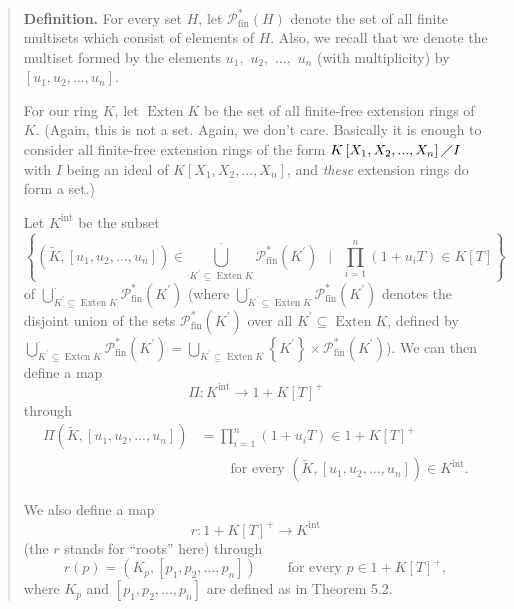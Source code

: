 \documentclass[numbers=enddot,12pt,final,onecolumn,notitlepage]{scrartcl}%
\begin{document}
\begin{quote}
\textbf{Definition.} For every set $H$, let $\mathcal{P}_{\operatorname*{fin}%
}^{\ast}\left(  H\right)  $ denote the set of all finite multisets which
consist of elements of $H$. Also, we recall that we denote the multiset formed
by the elements $u_{1},$ $u_{2},$ $...,$ $u_{n}$ (with multiplicity) by
$\left[  u_{1},u_{2},...,u_{n}\right]  $.

For our ring $K$, let $\operatorname*{Exten}K$ be the set of all finite-free
extension rings of $K$. (Again, this is not a set. Again, we don't care.
Basically it is enough to consider all finite-free extension rings of the form
$K\left[  X_{1},X_{2},...,X_{n}\right]  \diagup I$ with $I$ being an ideal of
$K\left[  X_{1},X_{2},...,X_{n}\right]  $, and \textit{these} extension rings
do form a set.)

Let $K^{\operatorname*{int}}$ be the subset%
\[
\left\{  \left(  \widetilde{K},\left[  u_{1},u_{2},...,u_{n}\right]  \right)
\in\bigcup\limits_{K^{\prime}\subseteq\operatorname*{Exten}K}^{\cdot
}\mathcal{P}_{\operatorname*{fin}}^{\ast}\left(  K^{\prime}\right)
\ \ \mid\ \ \prod\limits_{i=1}^{n}\left(  1+u_{i}T\right)  \in K\left[
T\right]  \right\}
\]
of $\bigcup\limits_{K^{\prime}\subseteq\operatorname*{Exten}K}^{\cdot
}\mathcal{P}_{\operatorname*{fin}}^{\ast}\left(  K^{\prime}\right)  $ (where
$\bigcup\limits_{K^{\prime}\subseteq\operatorname*{Exten}K}^{\cdot}%
\mathcal{P}_{\operatorname*{fin}}^{\ast}\left(  K^{\prime}\right)  $ denotes
the disjoint union of the sets $\mathcal{P}_{\operatorname*{fin}}^{\ast
}\left(  K^{\prime}\right)  $ over all $K^{\prime}\subseteq
\operatorname*{Exten}K$, defined by $\bigcup\limits_{K^{\prime}\subseteq
\operatorname*{Exten}K}^{\cdot}\mathcal{P}_{\operatorname*{fin}}^{\ast}\left(
K^{\prime}\right)  =\bigcup\limits_{K^{\prime}\subseteq\operatorname*{Exten}%
K}\left\{  K^{\prime}\right\}  \times\mathcal{P}_{\operatorname*{fin}}^{\ast
}\left(  K^{\prime}\right)  $). We can then define a map%
\[
\Pi:K^{\operatorname*{int}}\rightarrow1+K\left[  T\right]  ^{+}%
\]
through%
\begin{align*}
\Pi\left(  \widetilde{K},\left[  u_{1},u_{2},...,u_{n}\right]  \right)   &
=\prod\limits_{i=1}^{n}\left(  1+u_{i}T\right)  \in1+K\left[  T\right]  ^{+}\\
&  \ \ \ \ \ \ \ \ \ \ \text{for every }\left(  \widetilde{K},\left[
u_{1},u_{2},...,u_{n}\right]  \right)  \in K^{\operatorname*{int}}.
\end{align*}


We also define a map%
\[
r:1+K\left[  T\right]  ^{+}\rightarrow K^{\operatorname*{int}}%
\]
(the $r$ stands for ``roots'' here) through
\[
r\left(  p\right)  =\left(  K_{p},\left[  p_{1},p_{2},...,p_{n}\right]
\right)  \ \ \ \ \ \ \ \ \ \ \text{for every }p\in1+K\left[  T\right]  ^{+},
\]
where $K_{p}$ and $\left[  p_{1},p_{2},...,p_{n}\right]  $ are defined as in
Theorem 5.2.


\end{quote}
\end{document}
